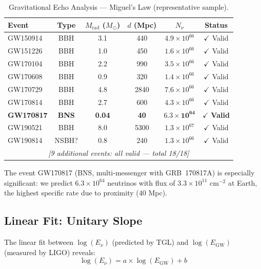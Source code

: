 \documentclass[12pt,a4paper,twoside]{article}
\begin{document}
\begin{table}[H]
\centering
\caption{Gravitational Echo Analysis --- Miguel's Law (representative sample).}
\label{tab:echoes}
\small
\begin{tabular}{lccccc}
\toprule
\textbf{Event} & \textbf{Type} & $M_{\text{rad}}$ ($M_\odot$) & $d$ (Mpc) & $N_\nu$ & \textbf{Status} \\
\midrule
GW150914 & BBH & 3.1 & 440 & $4.9 \times 10^{66}$ & $\checkmark$ Valid \\
GW151226 & BBH & 1.0 & 450 & $1.6 \times 10^{66}$ & $\checkmark$ Valid \\
GW170104 & BBH & 2.2 & 990 & $3.5 \times 10^{66}$ & $\checkmark$ Valid \\
GW170608 & BBH & 0.9 & 320 & $1.4 \times 10^{66}$ & $\checkmark$ Valid \\
GW170729 & BBH & 4.8 & 2840 & $7.6 \times 10^{66}$ & $\checkmark$ Valid \\
GW170814 & BBH & 2.7 & 600 & $4.3 \times 10^{66}$ & $\checkmark$ Valid \\
\textbf{GW170817} & \textbf{BNS} & \textbf{0.04} & \textbf{40} & $\mathbf{6.3 \times 10^{64}}$ & $\checkmark$ \textbf{Valid} \\
GW190521 & BBH & 8.0 & 5300 & $1.3 \times 10^{67}$ & $\checkmark$ Valid \\
GW190814 & NSBH? & 0.8 & 240 & $1.3 \times 10^{66}$ & $\checkmark$ Valid \\
\multicolumn{6}{c}{\textit{[9 additional events: all valid --- total 18/18]}} \\
\bottomrule
\end{tabular}
\end{table}

\noindent The event GW170817 (BNS, multi-messenger with GRB~170817A) is especially significant: we predict $6.3 \times 10^{64}$ neutrinos with flux of $3.3 \times 10^{11}$ cm$^{-2}$ at Earth, the highest specific rate due to proximity ($40$ Mpc).



\subsection{Linear Fit: Unitary Slope}

The linear fit between $\log(E_\nu)$ (predicted by TGL) and $\log(E_{\text{GW}})$ (measured by LIGO) reveals:
\begin{equation}
\log(E_\nu) = a \times \log(E_{\text{GW}}) + b
\label{eq:linear_fit}
\end{equation}
\end{document}
